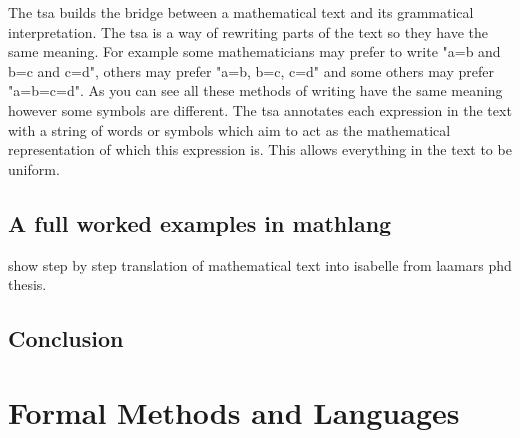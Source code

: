The \gls{tsa} builds the bridge between a mathematical text and its grammatical interpretation. The \gls{tsa} is a way of rewriting parts of the text so they have the same meaning. For example some mathematicians may prefer to write "a=b and b=c and c=d", others may prefer "a=b, b=c, c=d" and some others may prefer "a=b=c=d". As you can see all these methods of writing have the same meaning however some symbols are different. The \gls{tsa} annotates each expression in the text with a string of words or symbols which aim to act as the mathematical representation of which this expression is. This allows everything in the text to be uniform.

\subsection{A full worked examples in mathlang}

show step by step translation of mathematical text into isabelle from laamars phd thesis.

\subsection{Conclusion}

\section{Formal Methods and Languages}
\label{sec:formalmethodsandformallanguages}

